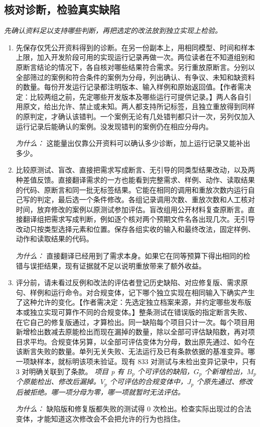 \documentclass[10pt,a4paper]{article}
\begin{document}
\subsection*{核对诊断，检验真实缺陷}
\emph{先确认资料足以支持哪些判断，再把选定的改法放到独立实现上检验。}
\begin{enumerate}[leftmargin=*,start=5]
  \item 先保存仅凭公开资料得到的诊断。在另一份副本上，用相同模型、时间和样本上限，加入开发阶段可用的实现运行记录再做一次。两位读者在不知道组别和原断言结论的情况下，各自核对哪些结果符合需求。另行重放原断言。分别以全部筛过的案例和符合条件的案例为分母，列出确认、有争议、未知和缺资料的数量。每份开发运行记录都注明版本、输入样例和原始返回值。【作者需决定：比较两组之前，先定哪些开发版本及哪些运行可提供记录。】两人各自引用原文，给出允许、禁止或未知。两人都支持所记标签，且独立重放得到同样的原判定，才确认该错判。一个案例无论有几处错判都只计一次，另列仅加入运行记录后能确认的案例。没发现错判的案例仍在相应分母内。
\par\emph{为什么：} 这能量出仅靠公开资料可以确认多少诊断，加上运行记录又能补出多少。
  \item 比较原测试、盲改、直接把需求写成断言、无引导的同类型结果改动，以及两种差值反馈。直接翻译需求的一方也能看到完整需求、样例、动作、读取结果的代码、原断言和同一批无标签结果。它能在相同的调用和重放次数内运行自己写的判定，最后选一个条件修改。各组记录调用次数、重放次数和人工核对时间，放弃修改的案例以原测试参加评估。盲改组用公开材料复查原断言。直接翻译组把需求写成判断，例如逐个核对两个预期文件名各出现几次。无引导改动只按类型选择元素和位置。保存各组实收的输入和最终改法，固定样例、动作和读取结果的代码。
\par\emph{为什么：} 直接翻译已经用到了需求本身。如果它在同等预算下得出相同的检错与误拒结果，现有证据就不足以说明重放带来了额外收益。
  \item 评分前，请未看过反例和改法的评估者登记历史缺陷、对应修复版、需求原句、样例和运行命令。对合规变体，记下哪个独立实现在相同输入下确实产生了这种允许的变化。【作者需决定：先选定独立档案来源，并约定哪些发布版本或独立实现可算作不同的合规变体。】整条测试在错误版的指定断言失败、在它自己的修复版通过，才算检出。同一缺陷每个项目只计一次。每个项目用新增检出数减去原能检出而现在漏掉的数量，除以全部可评估缺陷数，再对项目求平均。合规变体另算，以全部可评估变体为分母，数出原先通过、如今在该断言失败的数量。单列无关失败、无法运行及已有条款依据的基准变异。哪一项缺样本，就标明该项未验证。现有 833 对测试与未检出变异记录中，只有 3 对明确关联到了条款。
\noindent\emph{项目 p 有 \(B_{p}\) 个可评估的缺陷，\(G_{p}\) 个新增检出，\(M_{p}\) 个原能检出、修改后漏掉。\(V_{p}\) 个可评估的合规变体中，\(J_{p}\) 个原先通过、修改后被拒绝。哪一项分母为零，哪一项就暂时无法评估。}
\par{}
\par\emph{为什么：} 缺陷版和修复版都失败的测试得 0 次检出。检查实际出现过的合法变体，才能知道这次修改会不会把允许的行为也挡住。
\end{enumerate}
\end{document}
